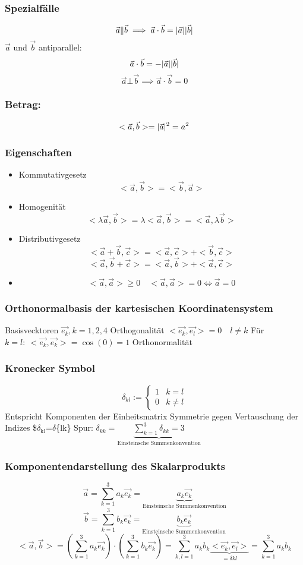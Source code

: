 \documentclass[a4paper]{scrartcl}
\DeclarePairedDelimiter\abs{\lvert}{\rvert}%
\begin{document}
\subsubsection{Spezialfälle}
\label{sec-12-2-3}
\[\vec{a}\|\vec{b}\implies \vec{a}\cdot\vec{b}=\abs{\vec{a}}\abs{\vec{b}}\]
$\vec{a}$ und $\vec{b}$ antiparallel:
\[\vec{a}\cdot\vec{b}=-\abs{\vec{a}}\abs{\vec{b}}\]
\[\vec{a}\bot\vec{b}\implies\vec{a}\cdot\vec{b}=0\]
\subsubsection{Betrag:}
\label{sec-12-2-4}
\[<\vec{a},\vec{b}>=\abs{\vec{a}}^2=a^2\]
\subsubsection{Eigenschaften}
\label{sec-12-2-5}
\begin{itemize}
\item Kommutativgesetz
\[<\vec{a},\vec{b}>=<\vec{b},\vec{a}>\]
\item Homogenität
\[<\lambda\vec{a},\vec{b}>=\lambda<\vec{a},\vec{b}>=<\vec{a},\lambda\vec{b}>\]
\item Distributivgesetz
\[<\vec{a}+\vec{b},\vec{c}>=<\vec{a},\vec{c}>+<\vec{b},\vec{c}>\]
\[<\vec{a},\vec{b}+\vec{c}>=<\vec{a},\vec{b}>+<\vec{a},\vec{c}>\]
\item \[<\vec{a},\vec{a}>\geq 0 \quad <\vec{a},\vec{a}>=0\iff\vec{a}=0\]
\end{itemize}
\subsubsection{Orthonormalbasis der kartesischen Koordinatensystem}
\label{sec-12-2-6}
Basisvecktoren $\vec{e_k}, k=1,2,4$
Orthogonalität $<\vec{e_k},\vec{e_l}> = 0\quad l\neq k$
Für $k=l:~<\vec{e_k},\vec{e_k}>=\cos(0)=1$
Orthonormalität
\subsubsection{Kronecker Symbol}
\label{sec-12-2-7}
\[\delta_{kl}:=\begin{cases}1&k=l\\0&k\neq l\end{cases}\]
Entspricht Komponenten der Einheitsmatrix
Symmetrie gegen Vertauschung der Indizes \$$\delta$$_{\text{kl}}$=$\delta$\{lk\}
Spur: $\delta_{kk} = \underbrace{\sum_{k=1}^3 \delta_{kk}=3}_{\text{Einsteinsche Summenkonvention}}$
\subsubsection{Komponentendarstellung des Skalarprodukts}
\label{sec-12-2-8}
\[\vec{a}=\sum_{k=1}^3 a_k \vec{e_k}=\underbrace{a_k \vec{e_k}}_{\text{Einsteinsche Summenkonvention}}\]
\[\vec{b}=\sum_{k=1}^3 b_k \vec{e_k}=\underbrace{b_k \vec{e_k}}_{\text{Einsteinsche Summenkonvention}}\]
\[<\vec{a},\vec{b}>=(\sum_{k=1}^3 a_k\vec{e_k})\cdot (\sum_{k=1}^3 b_k\vec{e_k}) = \sum_{k,l=1}^3 a_k b_k \underbrace{<\vec{e_k},\vec{e_l}>}_{=\delta{kl}} = \sum_{k=1}^3 a_k b_k\]
\end{document}
